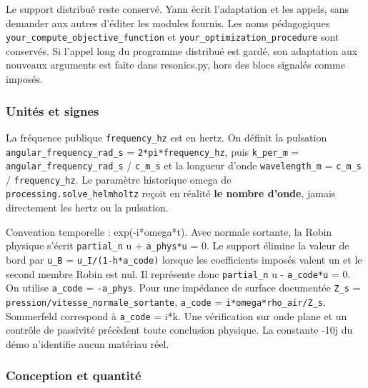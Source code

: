 \documentclass[11pt,a4paper]{article}
\begin{document}
Le support distribué reste conservé. Yann écrit l'adaptation et les appels, sans demander aux autres d'éditer les modules fournis. Les noms pédagogiques {\small\ttfamily \nolinkurl{your_compute_objective_function}} et {\small\ttfamily \nolinkurl{your_optimization_procedure}} sont conservés. Si l'appel long du programme distribué est gardé, son adaptation aux nouveaux arguments est faite dans {\small\ttfamily resonics.py}, hors des blocs signalés comme imposés.

\subsubsection{Unités et signes}

La fréquence publique {\small\ttfamily \nolinkurl{frequency_hz}} est en hertz. On définit la pulsation {\small\ttfamily \nolinkurl{angular_frequency_rad_s} = \nolinkurl{2*pi*frequency_hz}}, puis {\small\ttfamily \nolinkurl{k_per_m} = \nolinkurl{angular_frequency_rad_s} / \nolinkurl{c_m_s}} et la longueur d'onde {\small\ttfamily \nolinkurl{wavelength_m} = \nolinkurl{c_m_s} / \nolinkurl{frequency_hz}}. Le paramètre historique {\small\ttfamily omega} de {\small\ttfamily \nolinkurl{processing.solve_helmholtz}} reçoit en réalité \textbf{le nombre d'onde}, jamais directement les hertz ou la pulsation.

Convention temporelle : exp(-i*omega*t). Avec normale sortante, la Robin physique s'écrit {\small\ttfamily \nolinkurl{partial_n} u + \nolinkurl{a_phys*u} = 0}. Le support élimine la valeur de bord par {\small\ttfamily \nolinkurl{u_B} = \nolinkurl{u_I/(1-h*a_code)}} lorsque les coefficients imposés valent un et le second membre Robin est nul. Il représente donc {\small\ttfamily \nolinkurl{partial_n} u - \nolinkurl{a_code*u} = 0}. On utilise {\small\ttfamily \nolinkurl{a_code} = \nolinkurl{-a_phys}}. Pour une impédance de surface documentée {\small\ttfamily \nolinkurl{Z_s} = \nolinkurl{pression/vitesse_normale_sortante}}, {\small\ttfamily \nolinkurl{a_code} = \nolinkurl{i*omega*rho_air/Z_s}}. Sommerfeld correspond à {\small\ttfamily \nolinkurl{a_code} = i*k}. Une vérification sur onde plane et un contrôle de passivité précèdent toute conclusion physique. La constante {\small{}-10j} du démo n'identifie aucun matériau réel.

\subsubsection{Conception et quantité}
\end{document}
